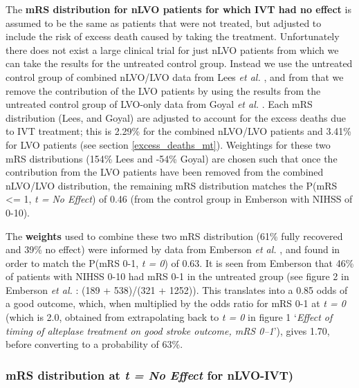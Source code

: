 The \textbf{mRS distribution for nLVO patients for which IVT had no effect} is assumed to be the same as patients that were not treated, but adjusted to include the risk of excess death caused by taking the treatment. Unfortunately there does not exist a large clinical trial for just nLVO patients from which we can take the results for the untreated control group. Instead we use the untreated control group of combined nLVO/LVO data from Lees \textit{et al.} \cite{lees_time_2010}, and from that we remove the contribution of the LVO patients by using the results from the untreated control group of LVO-only data from Goyal \textit{et al.} \cite{goyal_endovascular_2016}. Each mRS distribution (Lees, and Goyal) are adjusted to account for the excess deaths due to IVT treatment; this is 2.29\% for the combined nLVO/LVO patients and 3.41\% for LVO patients (see section \ref{excess_deaths_mt}). Weightings for these two mRS distributions (154\% Lees and -54\% Goyal) are chosen such that once the contribution from the LVO patients have been removed from the combined nLVO/LVO distribution, the remaining mRS distribution matches the P(mRS <= 1, \textit{t = No Effect}) of 0.46 (from the control group in Emberson with NIHSS of 0-10).

The \textbf{weights} used to combine these two mRS distribution (61\% fully recovered and 39\% no effect) were informed by data from Emberson \textit{et al.} \cite{emberson_effect_2014}, and found in order to match the P(mRS 0-1, \textit{t = 0}) of 0.63. It is seen from Emberson that 46\% of patients with NIHSS 0-10 had mRS 0-1 in the untreated group (see figure 2 in Emberson \textit{et al.} \cite{emberson_effect_2014}: (189 + 538)/(321 + 1252)). This translates into a 0.85 odds of a good outcome, which, when multiplied by the odds ratio for mRS 0-1 at \textit{t = 0} (which is 2.0, obtained from extrapolating back to \textit{t = 0} in figure 1 `\textit{Effect of timing of alteplase treatment on good stroke outcome, mRS 0–1}'), gives 1.70, before converting to a probability of 63\%.

\subsubsection{mRS distribution at \textit{t = No Effect} for nLVO-IVT)}

